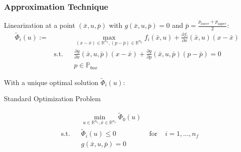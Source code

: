 \begin{frame}
	\frametitle{Approximation Technique}

\begin{block}{Linearization}
at a point $(\bar{x}, u, \bar{p})$ with $g(\bar{x}, u, \bar{p})=0$ and $\bar{p}=\frac{p_{lower}+p_{upper}}{2}$:	
	\begin{align*}
	\tilde{\Phi}_{i}(u):= &&& \max_{(x-\bar{x})\in\mathbb{R}^{n_{x}}, (p-\bar{p})\in\mathbb{R}^{n_{p}}} f_{i}(\bar{x}, u)+\frac{\partial f_{i}}{\partial x}(\bar{x}, u)(x-\bar{x}) \\
	& \text{s.t.} && \frac{\partial g}{\partial x}(\bar{x}, u, \bar{p})(x-\bar{x})+\frac{\partial g}{\partial p}(\bar{x}, u, \bar{p})(p-\bar{p})=0 \\
	&&& p\in\mathbb{P}_{box}
	\end{align*}

\end{block}	
	


With a unique optimal solution $\tilde{\Phi}_{i}(u)$: 
\begin{block}{Standard Optimization Problem}	

\begin{align*}
&&&\min_{u\in\mathbb{R}^{n_{u}}, \bar{x}\in\mathbb{R}^{n_{x}}} \tilde{\Phi}_{0}(u)\\
&\text{s.t.} &&  \tilde{\Phi}_{i}(u)\leq 0 & \text{ for } & i=1,\ldots,n_{f}\\
&&& g(\bar{x}, u, \bar{p})=0
\end{align*}
\end{block} 
	
\end{frame}
